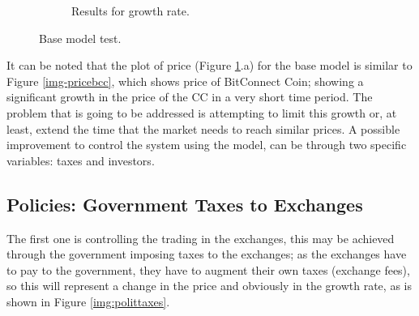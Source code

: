 \begin{figure}[H]
\begin{subfigure}[t]{0.4\textwidth}
        \centering
        \caption{Results for growth rate.}
      \end{subfigure}
      \caption{Base model test.}
      \label{img:base}
	\end{figure}
    
   It can be noted that the plot of price (Figure \ref{img:base}.a) for the base model is similar to Figure \ref{img-pricebcc}, which shows price of BitConnect Coin; showing a significant growth in the price of the CC in a very short time period. The problem that is going to be addressed is attempting to limit this growth or, at least, extend the time that the market needs to reach similar prices. A possible improvement to control the system using the model, can be through two specific variables: taxes and investors. 
   
   \subsection{Policies: Government Taxes to Exchanges}
   The first one is controlling the trading in the exchanges, this may be achieved through the government imposing taxes to the exchanges; as the exchanges have to pay to the government, they have to augment their own taxes (exchange fees), so this will represent a change in the price and obviously in the growth rate, as is shown in Figure \ref{img:polittaxes}.
   
